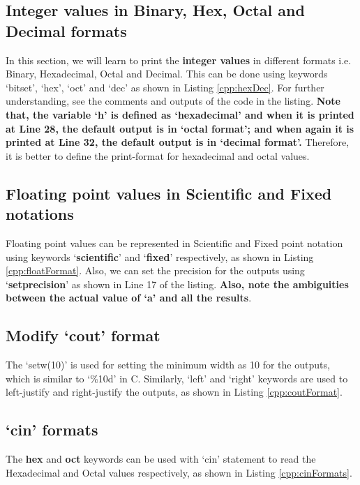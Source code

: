\subsection{Integer values in Binary, Hex, Octal and Decimal formats}
In this section, we will learn to print the \textbf{integer values} in different formats i.e. Binary, Hexadecimal, Octal and Decimal. This can be done using keywords `bitset', `hex', `oct' and `dec' as shown in Listing \ref{cpp:hexDec}. For further understanding,  see the comments and outputs of the code in the listing. \textbf{Note that, the variable `h' is defined as `hexadecimal' and when it is printed at Line 28, the default output is in `octal format'; and when again it is printed at Line 32, the default output is in `decimal format'.} Therefore, it is better to define the print-format for hexadecimal and octal values.  



\subsection{Floating point values in Scientific and Fixed notations}
Floating point values can be represented in Scientific and Fixed point notation using keywords `\textbf{scientific}' and `\textbf{fixed}' respectively, as shown in Listing \ref{cpp:floatFormat}. Also, we can set the precision for the outputs using `\textbf{setprecision}' as shown in Line 17 of the listing. \textbf{Also, note the ambiguities between the actual value of `a' and all the results}.  



\subsection{Modify `cout' format}
The `setw(10)' is used for setting the minimum width as 10 for the outputs, which is similar to `\%10d' in C. Similarly, `left' and `right' keywords are used to left-justify and right-justify the outputs, as shown in Listing \ref{cpp:coutFormat}. 



\subsection{`cin' formats}
The \textbf{hex} and \textbf{oct} keywords can be used with `cin' statement to read the Hexadecimal and Octal values respectively, as shown in Listing \ref{cpp:cinFormats}. 

